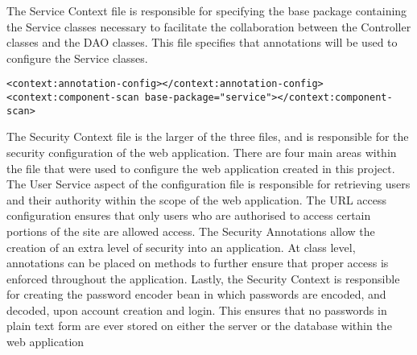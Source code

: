 The Service Context file is responsible for specifying the base package containing the Service classes necessary to facilitate the collaboration between the Controller classes and the DAO classes. This file specifies that annotations will be used to configure the Service classes.\newline

\begin{lstlisting}
<context:annotation-config></context:annotation-config>
<context:component-scan base-package="service"></context:component-scan>
\end{lstlisting}

The Security Context file is the larger of the three files, and is responsible for the security configuration of the web application. There are four main areas within the file that were used to configure the web application created in this project. \newline The User Service aspect of the configuration file is responsible for retrieving users and their authority within the scope of the web application. \newline The URL access configuration ensures that only users who are authorised to access certain portions of the site are allowed access. \newline The Security Annotations allow the creation of an extra level of security into an application. At class level, annotations can be placed on methods to further ensure that proper access is enforced throughout the application. \newline Lastly, the Security Context is responsible for creating the password encoder bean in which passwords are encoded, and decoded, upon account creation and login. This ensures that no passwords in plain text form are ever stored on either the server or the database within the web application \pagebreak

